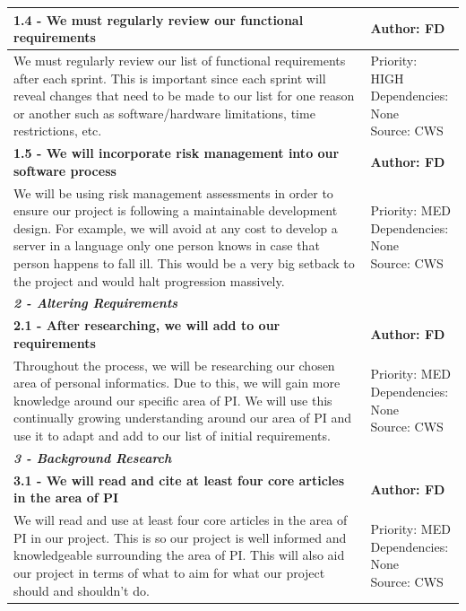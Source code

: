 \documentclass[10pt, notitlepage]{report}
\begin{document}
\begin{center}
\begin{longtable}{| p{13cm} | p{3cm} |}
\hline
\textbf{1.4 - We must regularly review our functional requirements} & \textbf{Author: FD} \\
\hline
We must regularly review our list of functional requirements after each sprint. This is important since each sprint will reveal changes that need to be made to our list for one reason or another such as software/hardware limitations, time restrictions, etc.&
\makecell{Priority: HIGH\\Dependencies: None\\Source: CWS}\\
\hline
\textbf{1.5 - We will incorporate risk management into our software process} & \textbf{Author: FD} \\
\hline
We will be using risk management assessments in order to ensure our project is following a maintainable development design. For example, we will avoid at any cost to develop a server in a language only one person knows in case that person happens to fall ill. This would be a very big setback to the project and would halt progression massively.&
\makecell{Priority: MED\\Dependencies: None\\Source: CWS}\\
\hline

\multicolumn{2}{|l|}{\textbf{\textit{2 - Altering Requirements}}} \\
\hline
\textbf{2.1 - After researching, we will add to our requirements} & \textbf{Author: FD} \\
\hline
Throughout the process, we will be researching our chosen area of personal informatics. Due to this, we will gain more knowledge around our specific area of PI. We will use this continually growing understanding around our area of PI and use it to adapt and add to our list of initial requirements.&
\makecell{Priority: MED\\Dependencies: None\\Source: CWS}\\
\hline

\multicolumn{2}{|l|}{\textbf{\textit{3 - Background Research}}} \\
\hline
\textbf{3.1 - We will read and cite at least four core articles in the area of PI} & \textbf{Author: FD} \\
\hline
We will read and use at least four core articles in the area of PI in our project. This is so our project is well informed and knowledgeable surrounding the area of PI. This will also aid our project in terms of what to aim for what our project should and shouldn’t do.&
\makecell{Priority: MED\\Dependencies: None\\Source: CWS}\\
\hline


\end{longtable}
\end{center}
\end{document}
